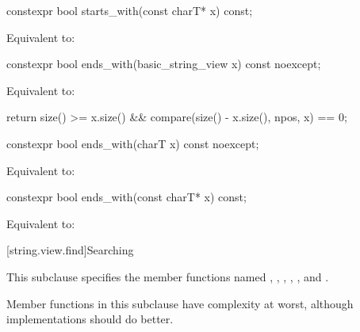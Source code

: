 %
\begin{itemdecl}
constexpr bool starts_with(const charT* x) const;
\end{itemdecl}

\begin{itemdescr}
\pnum
\effects
Equivalent to: 
\end{itemdescr}

%
\begin{itemdecl}
constexpr bool ends_with(basic_string_view x) const noexcept;
\end{itemdecl}

\begin{itemdescr}
\pnum
\effects
Equivalent to:
\begin{codeblock}
return size() >= x.size() && compare(size() - x.size(), npos, x) == 0;
\end{codeblock}
\end{itemdescr}

%
\begin{itemdecl}
constexpr bool ends_with(charT x) const noexcept;
\end{itemdecl}

\begin{itemdescr}
\pnum
\effects
Equivalent to: 
\end{itemdescr}

%
\begin{itemdecl}
constexpr bool ends_with(const charT* x) const;
\end{itemdecl}

\begin{itemdescr}
\pnum
\effects
Equivalent to: 
\end{itemdescr}

[string.view.find]{Searching}

\pnum
This subclause specifies the  member functions named
, , , , , and .

\pnum
Member functions in this subclause have complexity  at worst,
although implementations should do better.

